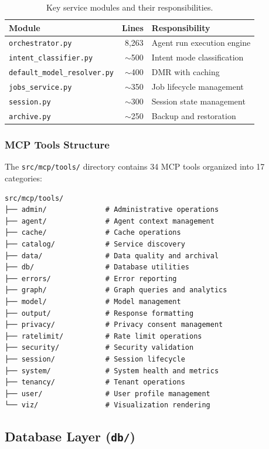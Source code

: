 \begin{table}[ht]
\centering
\caption{Key service modules and their responsibilities.}
\label{tab:service-modules}
\small
\begin{tabular}{lrl}
\hline
\textbf{Module} & \textbf{Lines} & \textbf{Responsibility} \\
\hline
\texttt{orchestrator.py} & 8,263 & Agent run execution engine \\
\texttt{intent\_classifier.py} & $\sim$500 & Intent mode classification \\
\texttt{default\_model\_resolver.py} & $\sim$400 & DMR with caching \\
\texttt{jobs\_service.py} & $\sim$350 & Job lifecycle management \\
\texttt{session.py} & $\sim$300 & Session state management \\
\texttt{archive.py} & $\sim$250 & Backup and restoration \\
\hline
\end{tabular}
\end{table}

\subsubsection{MCP Tools Structure}

The \texttt{src/mcp/tools/} directory contains 34 MCP tools organized into 17 categories:

\begin{verbatim}
src/mcp/tools/
├── admin/              # Administrative operations
├── agent/              # Agent context management
├── cache/              # Cache operations
├── catalog/            # Service discovery
├── data/               # Data quality and archival
├── db/                 # Database utilities
├── errors/             # Error reporting
├── graph/              # Graph queries and analytics
├── model/              # Model management
├── output/             # Response formatting
├── privacy/            # Privacy consent management
├── ratelimit/          # Rate limit operations
├── security/           # Security validation
├── session/            # Session lifecycle
├── system/             # System health and metrics
├── tenancy/            # Tenant operations
├── user/               # User profile management
└── viz/                # Visualization rendering
\end{verbatim}

\subsection{Database Layer (\texttt{db/})}

